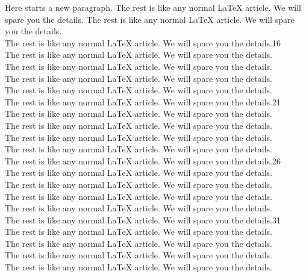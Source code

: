 \documentclass[submission,copyright,creativecommons]{eptcs}
\begin{document}
Here starts a new paragraph. The rest is like any normal {\LaTeX} article.
We will spare you the details.
The rest is like any normal {\LaTeX} article.
We will spare you the details.\\
The rest is like any normal {\LaTeX} article.
We will spare you the details.\hfill16\\
The rest is like any normal {\LaTeX} article.
We will spare you the details.\\
The rest is like any normal {\LaTeX} article.
We will spare you the details.\\
The rest is like any normal {\LaTeX} article.
We will spare you the details.\\
The rest is like any normal {\LaTeX} article.
We will spare you the details.\\
The rest is like any normal {\LaTeX} article.
We will spare you the details.\hfill21\\
The rest is like any normal {\LaTeX} article.
We will spare you the details.\\
The rest is like any normal {\LaTeX} article.
We will spare you the details.\\
The rest is like any normal {\LaTeX} article.
We will spare you the details.\\
The rest is like any normal {\LaTeX} article.
We will spare you the details.\\
The rest is like any normal {\LaTeX} article.
We will spare you the details.\hfill26\\
The rest is like any normal {\LaTeX} article.
We will spare you the details.\\
The rest is like any normal {\LaTeX} article.
We will spare you the details.\\
The rest is like any normal {\LaTeX} article.
We will spare you the details.\\
The rest is like any normal {\LaTeX} article.
We will spare you the details.\\
The rest is like any normal {\LaTeX} article.
We will spare you the details.\hfill31\\
The rest is like any normal {\LaTeX} article.
We will spare you the details.\\
The rest is like any normal {\LaTeX} article.
We will spare you the details.\\
The rest is like any normal {\LaTeX} article.
We will spare you the details.\\
The rest is like any normal {\LaTeX} article.
We will spare you the details.\\
\end{document}
